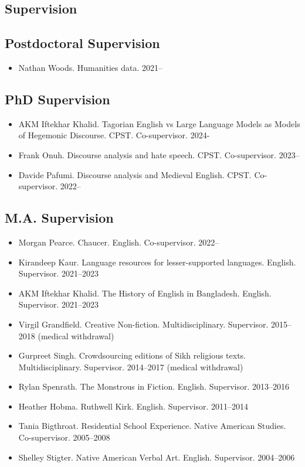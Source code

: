 \documentclass[12pt]{article}
\begin{document}
\subsection*{Supervision}


\subsection*{Postdoctoral Supervision}

\begin{itemize}
  \item Nathan Woods. Humanities data. 2021–
\end{itemize}


\subsection*{PhD Supervision}

\begin{itemize}
  \item AKM Iftekhar Khalid. Tagorian English vs Large Language Models as Models of Hegemonic Discourse. CPST. Co-supervisor. 2024-
  \item Frank Onuh. Discourse analysis and hate speech. CPST. Co-supervisor. 2023–
  \item Davide Pafumi. Discourse analysis and Medieval English. CPST. Co-supervisor. 2022–
\end{itemize}


\subsection*{M.A. Supervision}

\begin{itemize}
  \item Morgan Pearce. Chaucer. English. Co-supervisor. 2022–
  \item Kirandeep Kaur. Language resources for lesser-supported languages. English. Supervisor. 2021–2023
  \item AKM Iftekhar Khalid. The History of English in Bangladesh. English. Supervisor. 2021–2023
  \item Virgil Grandfield. Creative Non-fiction. Multidisciplinary. Supervisor. 2015–2018 (medical withdrawal)
  \item Gurpreet Singh. Crowdsourcing editions of Sikh religious texts. Multidisciplinary. Supervisor. 2014–2017 (medical withdrawal)
  \item Rylan Spenrath. The Monstrous in Fiction. English. Supervisor. 2013–2016
  \item Heather Hobma. Ruthwell Kirk. English. Supervisor. 2011–2014
  \item Tania Bigthroat. Residential School Experience. Native American Studies. Co-supervisor. 2005–2008
  \item Shelley Stigter. Native American Verbal Art. English. Supervisor. 2004–2006
\end{itemize}
\end{document}
